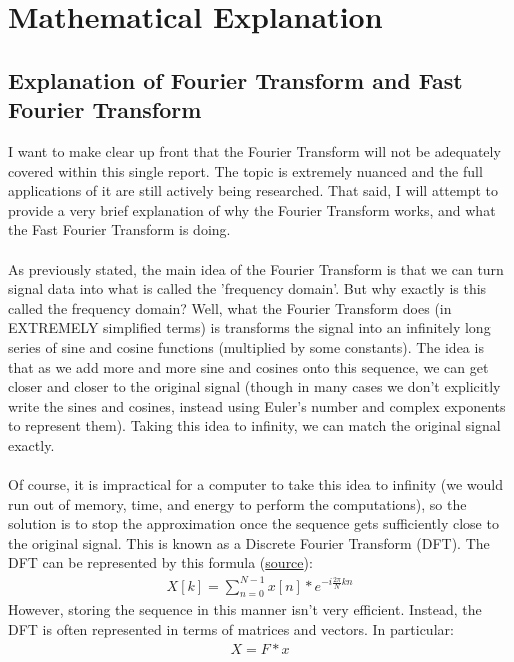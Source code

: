 \documentclass[notitlepage]{article}
\begin{document}
\section{Mathematical Explanation}

\subsection{Explanation of Fourier Transform and Fast Fourier Transform}

I want to make clear up front that the Fourier Transform will not be adequately covered
within this single report. The topic is extremely nuanced and the full applications of it
are still actively being researched. That said, I will attempt to provide a very brief explanation
of why the Fourier Transform works, and what the Fast Fourier Transform is doing.
\\\\
As previously stated, the main idea of the Fourier Transform is that we can
turn signal data into what is called the 'frequency domain'. But why exactly is
this called the frequency domain? Well, what the Fourier Transform does (in EXTREMELY
simplified terms) is transforms
the signal into an infinitely long series of sine and cosine functions (multiplied
by some constants). The idea is that as we add more and more sine and cosines onto
this sequence, we can get closer and closer to the original signal (though in many cases we
don't explicitly write the sines and cosines, instead using Euler's number and complex
exponents to represent them). Taking this idea
to infinity, we can match the original signal exactly.
\\\\
Of course, it is impractical for a computer to take this idea to infinity (we would
run out of memory, time, and energy to perform the computations), so the solution is
to stop the approximation once the sequence gets sufficiently close to the original signal.
This is known as a Discrete Fourier Transform (DFT). The DFT can be represented by this formula (\href{https://ccrma.stanford.edu/~jos/st/Matrix_Formulation_DFT.html}{source}):
\\
\begin{align*}
    X[k]=\sum_{n=0}^{N-1} x[n] * e^{-i\frac{2\pi}{N}kn}
\end{align*}
However, storing the sequence in this manner isn't very efficient. Instead,
the DFT is often represented in terms of matrices and vectors. In particular:
\begin{align*}
    X = F * x
\end{align*}
\end{document}
